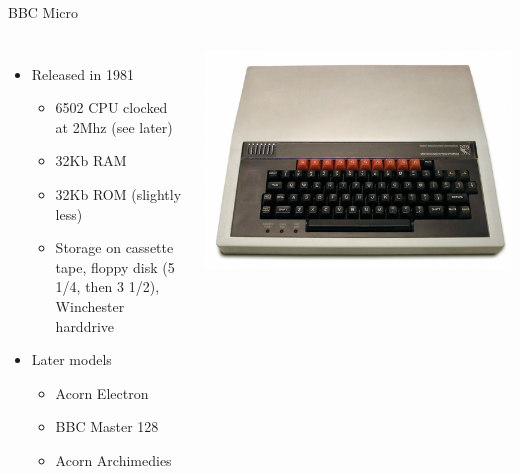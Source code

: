 \documentclass{beamer}
\begin{document}
\begin{frame}{BBC Micro}
  \begin{columns}
    
    \begin{itemize}
    \item
      Released in 1981
      \begin{itemize}
      \item
        6502 CPU clocked at 2Mhz (see later)
      \item
        32Kb RAM
      \item
        32Kb ROM (slightly less)
      \item
        Storage on cassette tape, floppy disk (5 1/4, then 3 1/2), Winchester harddrive
      \end{itemize}
    \item
      Later models
      \begin{itemize}
      \item
        Acorn Electron
      \item
        BBC Master 128
      \item
        Acorn Archimedies
      \end{itemize}
    \end{itemize}
    
    \begin{center}
      \includegraphics[scale=0.15]{../assets/BBC_Micro_Front_Restored.eps}
      \cite{BBCMicro}
    \end{center}
    
  \end{columns}
\end{frame}
\end{document}
